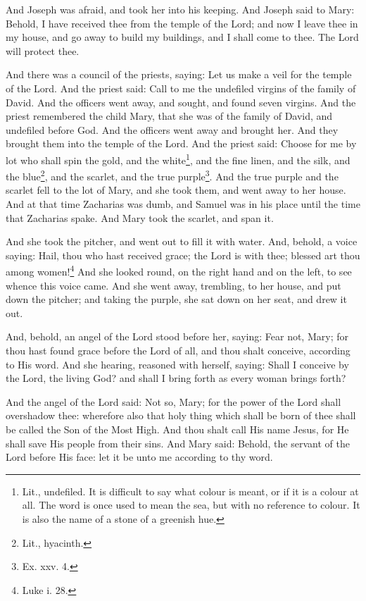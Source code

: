 \pend\pstart
And Joseph was afraid, and took her into his keeping. And Joseph said to Mary: Behold, I have received thee from the temple of the Lord; and now I leave thee in my house, and go away to build my buildings, and I shall come to thee. The Lord will protect thee.

\pend\pstart
{}

\pend\pstart
And there was a council of the priests, saying: Let us make a veil for the temple of the Lord. And the priest said: Call to me the undefiled virgins of the family of David. And the officers went away, and sought, and found seven virgins. And the priest remembered the child Mary, that she was of the family of David, and undefiled before God. And the officers went away and brought her. And they brought them into the temple of the Lord. And the priest said: Choose for me by lot who shall spin the gold, and the white\footnote{Lit., undefiled. It is difficult to say what colour is meant, or if it is a colour at all. The word is once used to mean the sea, but with no reference to colour. It is also the name of a stone of a greenish hue.}, and the fine linen, and the silk, and the blue\footnote{Lit., hyacinth.}, and the scarlet, and the true purple\footnote{Ex. xxv. 4.}. And the true purple and the scarlet fell to the lot of Mary, and she took them, and went away to her house. And at that time Zacharias was dumb, and Samuel was in his place until the time that Zacharias spake. And Mary took the scarlet, and span it.

\pend\pstart
{}

\pend\pstart
And she took the pitcher, and went out to fill it with water. And, behold, a voice saying: Hail, thou who hast received grace; the Lord is with thee; blessed art thou among women!\footnote{Luke i. 28.} And she looked round, on the right hand and on the left, to see whence this voice came. And she went away, trembling, to her house, and put down the pitcher; and taking the purple, she sat down on her seat, and drew it out.

\pend\pstart
And, behold, an angel of the Lord stood before her, saying: Fear not, Mary; for thou hast found grace before the Lord of all, and thou shalt conceive, according to His word. And she hearing, reasoned with herself, saying: Shall I conceive by the Lord, the living God? and shall I bring forth as every woman brings forth?

\pend\pstart
And the angel of the Lord said: Not so, Mary; for the power of the Lord shall overshadow thee: wherefore also that holy thing which shall be born of thee shall be called the Son of the Most High. And thou shalt call His name Jesus, for He shall save His people from their sins. And Mary said: Behold, the servant of the Lord before His face: let it be unto me according to thy word.

